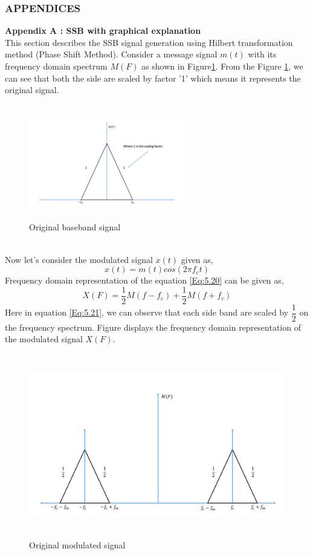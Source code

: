 \subsubsection{\textbf{APPENDICES}}
\textbf{Appendix A : SSB with graphical explanation}\\
This section describes the SSB signal generation using Hilbert transformation method (Phase Shift Method). Consider a message signal $m(t)$ with its frequency domain spectrum $M(F)$ as shown in Figure\ref{Original_baseband_signal}. From the Figure \ref{Original_baseband_signal}, we can see that both the side are scaled by factor '1' which means it represents the original signal.
\begin{figure}[h]
	\centering
	\includegraphics[width=0.6\textwidth, height=5cm]{./sdf/simplified_coherent_receiver/figures/SSB1.pdf}
	\caption{Original baseband signal}\label{Original_baseband_signal}
\end{figure}\\ 	
Now let's consider the modulated signal $x(t)$ given as,
\begin{equation}
x(t)=m(t) cos(2\pi f_c t)
\label{Eq:5.20}
\end{equation}
Frequency domain representation of the equation \ref{Eq:5.20} can be given as,
\begin{equation}
X(F)=\frac{1}{2}M(f-f_c)+\frac{1}{2}M(f+f_c)
\label{Eq:5.21}
\end{equation}
Here in equation \ref{Eq:5.21}, we can observe that each side band are scaled by $\dfrac{1}{2}$ on the frequency spectrum. Figure displays the frequency domain representation of the modulated signal $X(F)$.
\begin{figure}[h]
	\centering
	\includegraphics[width=1.0\textwidth, height=8cm]{./sdf/simplified_coherent_receiver/figures/SSB2.pdf}
	\caption{Original modulated signal}\label{Original_modulated_signal}
\end{figure}\\ 

